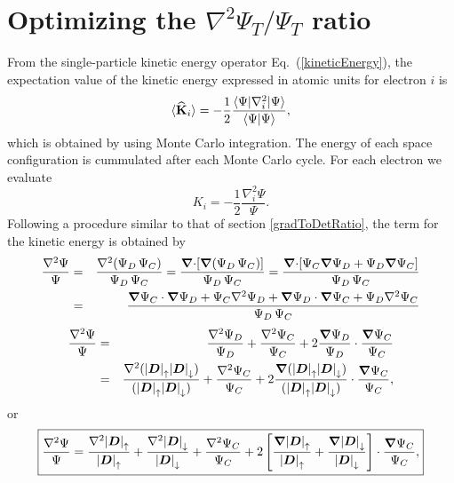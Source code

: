 \section{Optimizing the $\nabla^2 \Psi_T/\Psi_T$ ratio}\label{kineticEnergyTerm}
From the single-particle kinetic energy operator Eq.~(\ref{kineticEnergy}), the expectation value of the kinetic energy expressed in atomic units for electron $i$ is 
\begin{equation}
 \langle {\bf\widehat{K}}_i \rangle = -\frac{1}{2}\frac{\langle\Psi|\nabla_{i}^2|\Psi \rangle}{\langle\Psi|\Psi \rangle},
\end{equation}
which is obtained by using Monte Carlo integration. The energy of each space con\-fi\-gu\-ra\-tion is cummulated after each Monte Carlo cycle. For each electron we evaluate
\begin{equation}\label{kineticE}
K_i = -\frac{1}{2}\frac{\nabla_{i}^{2} \Psi}{\Psi}.
\end{equation}
Following a procedure similar to that of section \ref{gradToDetRatio}, the term for the kinetic energy is obtained by
\begin{eqnarray}
\frac{\nabla^2 \Psi}{\Psi} & = & \frac{\nabla^2 ({\Psi_{D} \,  \Psi_C})}{\Psi_{D} \,  \Psi_C} = \frac{\boldsymbol{\nabla}{\cdot} [\boldsymbol{\nabla}{(\Psi_{D} \,  \Psi_C)}]}{\Psi_{D} \,  \Psi_C} = \frac{\boldsymbol{\nabla}{\cdot} [ \Psi_C \boldsymbol{\nabla}{\Psi}_{D} + \Psi_{D} \boldsymbol{\nabla}{\Psi}_C]}{\Psi_{D} \,  \Psi_C}\nonumber\\
&  = & \frac{\boldsymbol{\nabla}{\Psi}_C \cdot \boldsymbol{\nabla}{\Psi}_{D} +  \Psi_C \nabla^2 \Psi_{D} + \boldsymbol{\nabla}{\Psi}_{D} \cdot \boldsymbol{\nabla}{\Psi}_C + \Psi_{D} \nabla^2  \Psi_C}{\Psi_{D} \,  \Psi_C}\nonumber\\
\end{eqnarray}
\begin{eqnarray}
\frac{\nabla^2 \Psi}{\Psi}
& = & \frac{\nabla^2 \Psi_{D}}{\Psi_{D}} + \frac{\nabla^2  \Psi_C}{ \Psi_C} + 2 \frac{\boldsymbol{\nabla}{\Psi}_{D}}{\Psi_{D}}\cdot\frac{\boldsymbol{\nabla}{\Psi}_C}{ \Psi_C}\nonumber\\
& = & \frac{\nabla^2 ({|\boldsymbol{D}|}_{\uparrow} {|\boldsymbol{D}|}_{\downarrow})}{({|\boldsymbol{D}|}_{\uparrow} {|\boldsymbol{D}|}_{\downarrow})} + \frac{\nabla^2 \Psi_C}{\Psi_C} + 2 \frac{\boldsymbol{\nabla}{(}{|\boldsymbol{D}|}_{\uparrow} {|\boldsymbol{D}|}_{\downarrow})}{({|\boldsymbol{D}|}_{\uparrow} {|\boldsymbol{D}|}_{\downarrow})}\cdot\frac{\boldsymbol{\nabla}{\Psi}_C}{\Psi_C},\nonumber
\end{eqnarray}
or 
\begin{equation}\label{laplacian_psi_psi_ratio}
\boxed{\frac{\nabla^2 \Psi}{\Psi} = \frac{\nabla^2 {|\boldsymbol{D}|}_{\uparrow}}{{|\boldsymbol{D}|}_{\uparrow}} + \frac{\nabla^2 {|\boldsymbol{D}|}_{\downarrow}}{{|\boldsymbol{D}|}_{\downarrow}} + \frac{\nabla^2 \Psi_C}{\Psi_C} + 2 \left[\frac{\boldsymbol{\nabla}{{|\boldsymbol{D}|}_{\uparrow}}}{{|\boldsymbol{D}|}_{\uparrow}} +  \frac{\boldsymbol{\nabla}{{|\boldsymbol{D}|}_{\downarrow}}}{{|\boldsymbol{D}|}_{\downarrow}}\right]\cdot \frac{\boldsymbol{\nabla}{\Psi_C}}{\Psi_C},}
\end{equation}

